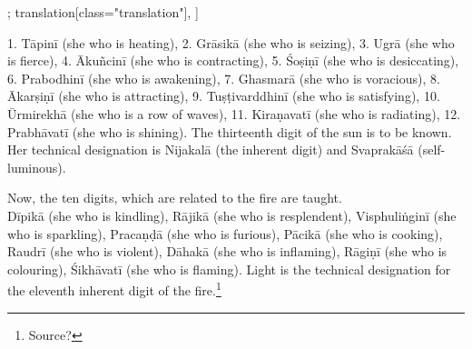 \begin{alignment}[
  texts=edition[class="edition"];
  translation[class="translation"],
  ]
\begin{translation}
\begin{tlate}[p55_01]
1. Tāpinī (she who is heating), 2. Grāsikā (she who is seizing), 3. Ugrā (she who is fierce), 4. Ākuñcinī (she who is contracting), 5. Śoṣiṇī (she who is desiccating), 6. Prabodhinī (she who is awakening), 7. Ghasmarā (she who is voracious), 8. Ākarṣiṇī (she who is attracting), 9. Tuṣṭivarddhinī (she who is satisfying), 10. Ūrmirekhā (she who is a row of waves), 11. Kiraṇavatī (she who is radiating), 12. Prabhāvatī (she who is shining). The thirteenth digit of the sun is to be known. Her technical designation is Nijakalā (the inherent digit) and Svaprakāśā (self-luminous).
\end{tlate}
               \label{agnikalatrans}
               \begin{tlate}[p56_01]
                 \noindent
Now, the ten digits, which are related to the fire are taught.\\

Dīpikā (she who is kindling), Rājikā (she who is resplendent), Visphuliṅginī (she who is sparkling), Pracaṇḍā (she who is furious), Pācikā (she who is cooking), Raudrī (she who is violent), Dāhakā (she who is inflaming), Rāgiṇī (she who is colouring), Śikhāvatī (she who is flaming). Light is the technical designation for the eleventh inherent digit of the fire.\footnote{Source?}
\flushpage
    \end{tlate}
  \end{translation}
\end{alignment}
\pagebreak %
